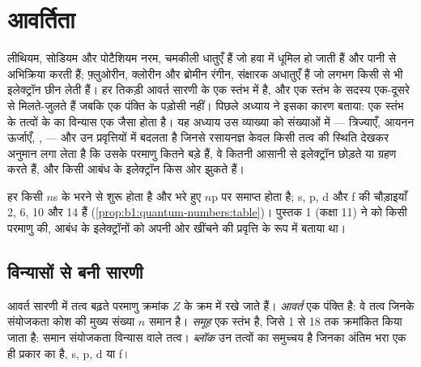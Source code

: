 \chapter{आवर्तिता}\label{ch:b1:periodicity}

लीथियम, सोडियम और पोटैशियम नरम, चमकीली धातुएँ हैं जो हवा में धूमिल हो
जाती हैं और पानी से अभिक्रिया करती हैं; फ़्लुओरीन, क्लोरीन और ब्रोमीन रंगीन,
संक्षारक अधातुएँ हैं जो लगभग किसी से भी इलेक्ट्रॉन छीन लेती हैं। हर तिकड़ी
आवर्त सारणी के एक स्तंभ में है, और एक स्तंभ के सदस्य एक-दूसरे से मिलते-जुलते
हैं जबकि एक पंक्ति के पड़ोसी नहीं। पिछले अध्याय ने इसका कारण बताया: एक स्तंभ
के तत्वों के  का विन्यास एक जैसा होता है। यह अध्याय उस
व्याख्या को संख्याओं में --- त्रिज्याएँ, आयनन ऊर्जाएँ, ,
 --- और उन प्रवृत्तियों में बदलता है जिनसे रसायनज्ञ केवल
किसी तत्व की स्थिति देखकर अनुमान लगा लेता है कि उसके परमाणु कितने बड़े हैं,
वे कितनी आसानी से इलेक्ट्रॉन छोड़ते या ग्रहण करते हैं, और किसी आबंध के
इलेक्ट्रॉन किस ओर झुकते हैं।

\begin{recall}
हर  किसी $n$s  के भरने से शुरू होता है और भरे हुए
$n$p  पर समाप्त होता है; s, p, d और f  की चौड़ाइयाँ 2, 6, 10
और 14 हैं (\cref{prop:b1:quantum-numbers:table})। पुस्तक 1 (कक्षा 11)
ने  को किसी परमाणु की, आबंध के इलेक्ट्रॉनों को अपनी ओर
खींचने की प्रवृत्ति के रूप में बताया था।
\end{recall}

\section{विन्यासों से बनी सारणी}

\begin{definition}[आवर्त, समूह, ब्लॉक]\label{def:b1:periodicity:table}
आवर्त सारणी में तत्व बढ़ते परमाणु क्रमांक $Z$ के क्रम में रखे जाते हैं।
\emph{आवर्त} एक पंक्ति है: वे तत्व जिनके संयोजकता कोश की
मुख्य संख्या $n$ समान है।
\emph{समूह} एक स्तंभ है, जिसे 1 से 18 तक क्रमांकित किया जाता है:
समान संयोजकता विन्यास वाले तत्व। \emph{ब्लॉक} उन तत्वों का
समुच्चय है जिनका अंतिम भरा  एक ही प्रकार का है, s, p, d या f।
\end{definition}

